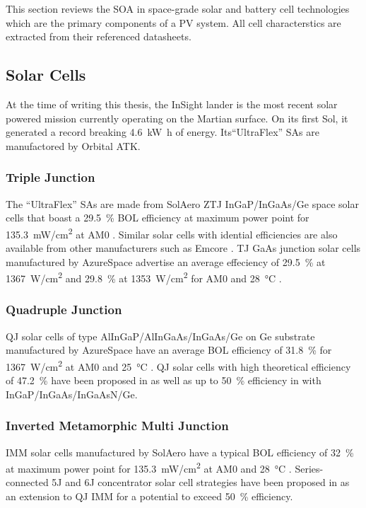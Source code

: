 This section reviews the \ac{SOA} in space-grade solar and battery cell technologies which are the primary components of a \ac{PV} system. All cell characterstics are extracted from their referenced datasheets.

\subsection{Solar Cells}
At the time of writing this thesis, the InSight lander is the most recent solar powered mission currently operating on the Martian surface. On its first Sol, it generated a record breaking \SI{4.6}{\kilo\watt\hour} of energy. Its``UltraFlex'' \acp{SA} are manufactored by Orbital ATK.

\subsubsection{Triple Junction}
The ``UltraFlex'' \acp{SA} are made from SolAero \ac{ZTJ} \ac{InGaP}/\ac{InGaAs}/\ac{Ge} space solar cells that boast a \SI{29.5}{\percent} \ac{BOL} efficiency at maximum power point for \SI{135.3}{\milli\watt/\centi\meter^{2}} at \ac{AM0} . Similar solar cells with idential efficiencies are also available from other manufacturers such as Emcore . \ac{TJ} \ac{GaAs} junction solar cells manufactured by AzureSpace advertise an average effeciency of \SI{29.5}{\percent} at \SI{1367}{\watt/\centi\meter^{2}} and \SI{29.8}{\percent} at \SI{1353}{\watt/\centi\meter^{2}} for \ac{AM0} and \SI{28}{\celsius} .

\subsubsection{Quadruple Junction}
\ac{QJ} solar cells of type \ac{AlInGaP}/\ac{AlInGaAs}/\ac{InGaAs}/\ac{Ge} on \ac{Ge} substrate manufactured by AzureSpace have an average \ac{BOL} efficiency of \SI{31.8}{\percent} for \SI{1367}{\watt/\centi\meter^{2}} at \ac{AM0} and \SI{25}{\celsius} . \ac{QJ} solar cells with high theoretical efficiency of \SI{47.2}{\percent} have been proposed in  as well as up to \SI{50}{\percent} efficiency in  with \ac{InGaP}/\ac{InGaAs}/\ac{InGaAsN}/\ac{Ge}.

\subsubsection{Inverted Metamorphic Multi Junction}
\ac{IMM} solar cells manufactured by SolAero have a typical \ac{BOL} efficiency of \SI{32}{\percent} at maximum power point for \SI{135.3}{\milli\watt/\centi\meter^{2}} at \ac{AM0} and \SI{28}{\celsius} . Series-connected \ac{5J} and \ac{6J} concentrator solar cell strategies have been proposed in  as an extension to \ac{QJ} \ac{IMM} for a potential to exceed \SI{50}{\percent} efficiency.

